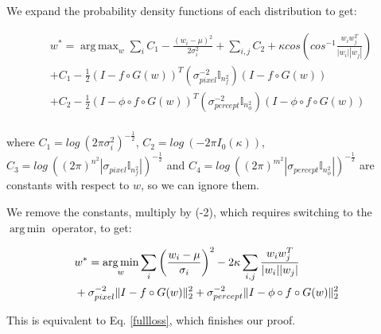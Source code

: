 \documentclass{article}
\DeclarePairedDelimiter{\norm}{\lVert}{\rVert}
\DeclareMathOperator*{\argmin}{arg\,min}
\DeclareMathOperator*{\argmax}{arg\,max}
\newcommand{\mc}[1]{\mathbb{#1}}
\newcommand{\ci}[1]{\circ{#1}}
\begin{document}
We expand the probability density functions of each distribution to get:


\begin{equation}
\begin{aligned}
\label{constants}
& w^* = \argmax_w \sum_i C_1 - \frac{(w_i-\mu)^2}{2\sigma_i^2} + \sum_{i,j} C_2 + \kappa cos(cos^{-1}\frac{w_iw_j^T}{|w_i| |w_j|}) \\
& + C_1 - \frac{1}{2} (I - f \ci G(w))^T(\sigma_{pixel}^{-2} \mc{I}_{n_f^2})(I-f \ci G(w)) \\
& + C_2 - \frac{1}{2} (I - \phi \ci f \ci G(w))^T(\sigma_{percept}^{-2} \mc{I}_{n_{\phi}^2})(I-\phi \ci f \ci G(w)) \\
\end{aligned}
\end{equation}

where $C_1 = log\ (2 \pi \sigma_i^2)^{-\frac{1}{2}}$, $C_2 = log\ (-2 \pi I_0(\kappa))$, $C_3 = log\ ((2\pi)^{n^2} |\sigma_{pixel} \mc{I}_{n_f^2}| )^{-\frac{1}{2}}$ and $C_4 = log\ ((2\pi)^{m^2} | \sigma_{percept} \mc{I}_{n_{\phi}^2} | )^{-\frac{1}{2}} $ are constants with respect to $w$, so we can ignore them. 

We remove the constants, multiply by (-2), which requires switching to the $\argmin$ operator, to get:

\begin{equation}
\begin{aligned}
\label{bfinalappendix}
& w^* = \argmin_w \sum_i \left(\frac{w_i-\mu}{\sigma_i}\right)^2 - 2\kappa \sum_{i,j} \frac{w_iw_j^T}{|w_i| |w_j|} \\
& + \sigma_{pixel}^{-2} \norm{I - f \ci G(w)}_2^2 + \sigma_{percept}^{-2} \norm{I - \phi \ci f \ci G(w)}_2^2 \\
\end{aligned}
\end{equation}

This is equivalent to Eq. \ref{fullloss}, which finishes our proof. 
\end{document}
